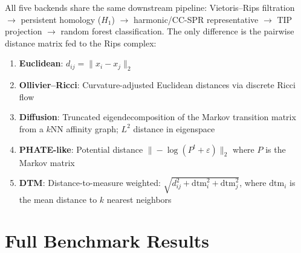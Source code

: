 \documentclass[11pt]{article}
\begin{document}
All five backends share the same downstream pipeline: Vietoris--Rips filtration $\to$ persistent homology ($H_1$) $\to$ harmonic/CC-SPR representative $\to$ TIP projection $\to$ random forest classification.
The only difference is the pairwise distance matrix fed to the Rips complex:

\begin{enumerate}[leftmargin=1.5em]
\item \textbf{Euclidean}: $d_{ij} = \|x_i - x_j\|_2$
\item \textbf{Ollivier--Ricci}: Curvature-adjusted Euclidean distances via discrete Ricci flow
\item \textbf{Diffusion}: Truncated eigendecomposition of the Markov transition matrix from a $k$NN affinity graph; $L^2$ distance in eigenspace
\item \textbf{PHATE-like}: Potential distance $\|-\log(P^t + \varepsilon)\|_2$ where $P$ is the Markov matrix
\item \textbf{DTM}: Distance-to-measure weighted: $\sqrt{d_{ij}^2 + \text{dtm}_i^2 + \text{dtm}_j^2}$, where $\text{dtm}_i$ is the mean distance to $k$ nearest neighbors
\end{enumerate}

\section{Full Benchmark Results}
\label{sec:benchmark}
\end{document}

